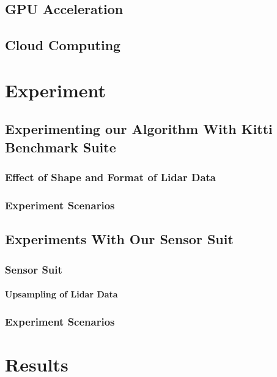 \documentclass[conference]{IEEEtran}
\begin{document}
\subsection{GPU Acceleration}
\subsection{Cloud Computing}

\section{Experiment}

\subsection{Experimenting our Algorithm With Kitti Benchmark Suite}

\subsubsection{Effect of Shape and Format of Lidar Data}
\subsubsection{Experiment Scenarios}

\subsection{Experiments With Our Sensor Suit}

\subsubsection{Sensor Suit}
\paragraph{Upsampling of Lidar Data}

\subsubsection{Experiment Scenarios}


\section{Results}
\end{document}
